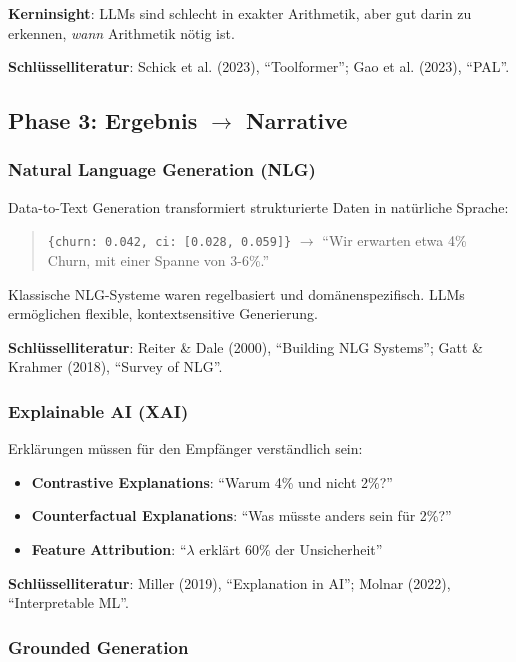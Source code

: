 \documentclass[12pt,a4paper]{article}
\begin{document}
\textbf{Kerninsight}: LLMs sind schlecht in exakter Arithmetik, aber gut darin zu erkennen, \textit{wann} Arithmetik nötig ist.

\textbf{Schlüsselliteratur}: Schick et al. (2023), ``Toolformer''; Gao et al. (2023), ``PAL''.

\subsection{Phase 3: Ergebnis $\rightarrow$ Narrative}

\subsubsection{Natural Language Generation (NLG)}

Data-to-Text Generation transformiert strukturierte Daten in natürliche Sprache:

\begin{quote}
\texttt{\{churn: 0.042, ci: [0.028, 0.059]\}} $\rightarrow$ ``Wir erwarten etwa 4\% Churn, mit einer Spanne von 3-6\%.''
\end{quote}

Klassische NLG-Systeme waren regelbasiert und domänenspezifisch.
LLMs ermöglichen flexible, kontextsensitive Generierung.

\textbf{Schlüsselliteratur}: Reiter \& Dale (2000), ``Building NLG Systems''; Gatt \& Krahmer (2018), ``Survey of NLG''.

\subsubsection{Explainable AI (XAI)}

Erklärungen müssen für den Empfänger verständlich sein:

\begin{itemize}
    \item \textbf{Contrastive Explanations}: ``Warum 4\% und nicht 2\%?''
    \item \textbf{Counterfactual Explanations}: ``Was müsste anders sein für 2\%?''
    \item \textbf{Feature Attribution}: ``$\lambda$ erklärt 60\% der Unsicherheit''
\end{itemize}

\textbf{Schlüsselliteratur}: Miller (2019), ``Explanation in AI''; Molnar (2022), ``Interpretable ML''.

\subsubsection{Grounded Generation}
\end{document}
